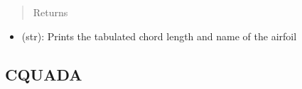 \documentclass[letterpaper,10pt,english]{sphinxmanual}
\begin{document}
\begin{fulllineitems}
\begin{fulllineitems}
\begin{itemize}
\end{itemize}
\begin{quote}\begin{description}
\item[{Returns}] \leavevmode
\end{description}\end{quote}
\begin{itemize}
\item {} 
(str): Prints the tabulated chord length and name of the airfoil

\end{itemize}

\end{fulllineitems}


\end{fulllineitems}



\subsection{CQUADA}
\label{aerodynamics:cquada}
\end{document}
